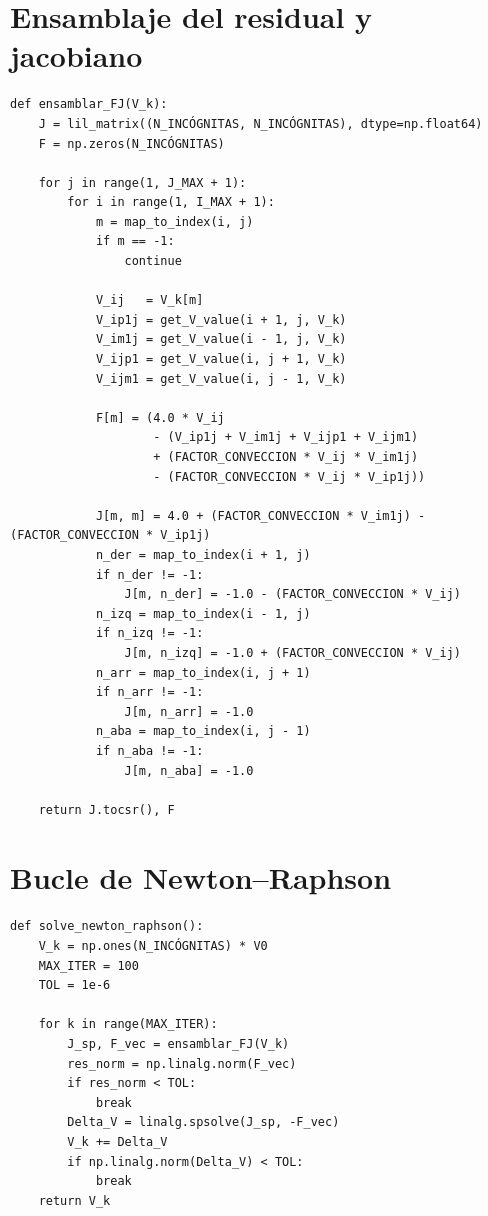 \documentclass[12pt,a4paper]{report}
\theoremstyle{definition}
\begin{document}
\section{Ensamblaje del residual y jacobiano}
\begin{lstlisting}[style=mypython]
def ensamblar_FJ(V_k):
    J = lil_matrix((N_INCÓGNITAS, N_INCÓGNITAS), dtype=np.float64)
    F = np.zeros(N_INCÓGNITAS)

    for j in range(1, J_MAX + 1):
        for i in range(1, I_MAX + 1):
            m = map_to_index(i, j)
            if m == -1:
                continue

            V_ij   = V_k[m]
            V_ip1j = get_V_value(i + 1, j, V_k)
            V_im1j = get_V_value(i - 1, j, V_k)
            V_ijp1 = get_V_value(i, j + 1, V_k)
            V_ijm1 = get_V_value(i, j - 1, V_k)

            F[m] = (4.0 * V_ij
                    - (V_ip1j + V_im1j + V_ijp1 + V_ijm1)
                    + (FACTOR_CONVECCION * V_ij * V_im1j)
                    - (FACTOR_CONVECCION * V_ij * V_ip1j))

            J[m, m] = 4.0 + (FACTOR_CONVECCION * V_im1j) - (FACTOR_CONVECCION * V_ip1j)
            n_der = map_to_index(i + 1, j)
            if n_der != -1:
                J[m, n_der] = -1.0 - (FACTOR_CONVECCION * V_ij)
            n_izq = map_to_index(i - 1, j)
            if n_izq != -1:
                J[m, n_izq] = -1.0 + (FACTOR_CONVECCION * V_ij)
            n_arr = map_to_index(i, j + 1)
            if n_arr != -1:
                J[m, n_arr] = -1.0
            n_aba = map_to_index(i, j - 1)
            if n_aba != -1:
                J[m, n_aba] = -1.0

    return J.tocsr(), F
\end{lstlisting}

\section{Bucle de Newton--Raphson}
\begin{lstlisting}[style=mypython]
def solve_newton_raphson():
    V_k = np.ones(N_INCÓGNITAS) * V0
    MAX_ITER = 100
    TOL = 1e-6

    for k in range(MAX_ITER):
        J_sp, F_vec = ensamblar_FJ(V_k)
        res_norm = np.linalg.norm(F_vec)
        if res_norm < TOL:
            break
        Delta_V = linalg.spsolve(J_sp, -F_vec)
        V_k += Delta_V
        if np.linalg.norm(Delta_V) < TOL:
            break
    return V_k
\end{lstlisting}
\end{document}
